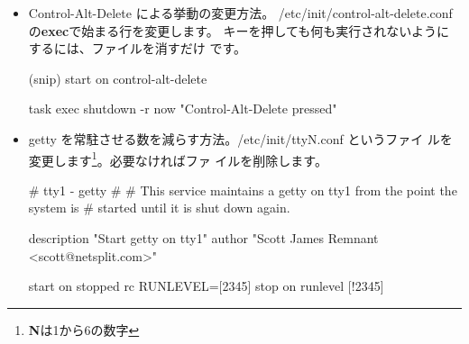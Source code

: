 \documentclass[mingoth,a4paper]{jsarticle}
\begin{document}
\begin{itemize}
 \item Control-Alt-Delete による挙動の変更方法。
       /etc/init/control-alt-delete.confの\textbf{exec}で始まる行を変更します。
       キーを押しても何も実行されないようにするには、ファイルを消すだけ
       です。
\begin{commandline}
(snip)
start on control-alt-delete

task
exec shutdown -r now "Control-Alt-Delete pressed"
\end{commandline}
 \item getty を常駐させる数を減らす方法。/etc/init/ttyN.conf というファイ
       ルを変更します\footnote{\textbf{N}は1から6の数字}。必要なければファ
       イルを削除します。
\begin{commandline}
# tty1 - getty
#
# This service maintains a getty on tty1 from the point the system is
# started until it is shut down again.

description     "Start getty on tty1"
author          "Scott James Remnant <scott@netsplit.com>"

start on stopped rc RUNLEVEL=[2345]
stop on runlevel [!2345]


\end{commandline}
\end{itemize}
\end{document}
